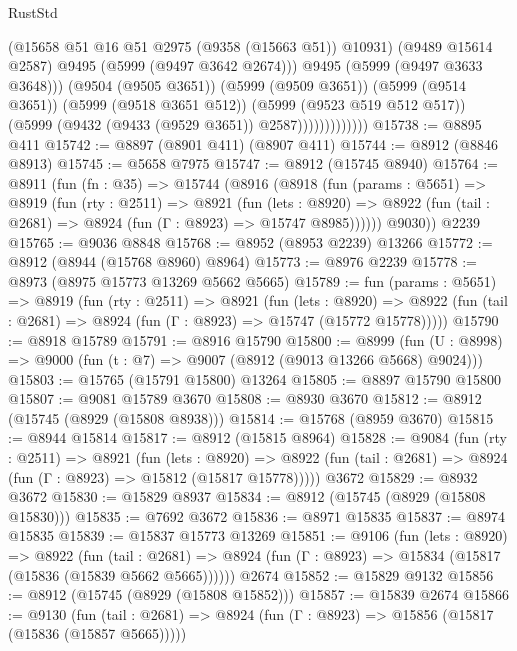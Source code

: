 \begin{lexlean}{RustStd}
\begin{coremodule}
                              (@15658 @51 @16 @51 @2975 (@9358 (@15663 @51)) @10931)
                              (@9489 @15614 @2587)
                              @9495
                              (@5999 (@9497 @3642 @2674)))
                            @9495
                            (@5999 (@9497 @3633 @3648)))
                          (@9504 (@9505 @3651))
                          (@5999 (@9509 @3651))
                          (@5999 (@9514 @3651))
                          (@5999 (@9518 @3651 @512))
                          (@5999 (@9523 @519 @512 @517))
                          (@5999 (@9432 (@9433 (@9529 @3651)) @2587)))))))))))))
@15738 := @8895 @411
@15742 := @8897 (@8901 @411) (@8907 @411)
@15744 := @8912 (@8846 @8913)
@15745 := @5658 @7975
@15747 := @8912 (@15745 @8940)
@15764 := @8911
    (fun (fn : @35) =>
    @15744
      (@8916
        (@8918
          (fun (params : @5651) =>
          @8919
            (fun (rty : @2511) =>
            @8921
              (fun (lets : @8920) =>
              @8922 (fun (tail : @2681) => @8924 (fun (Γ : @8923) => @15747 @8985))))))
        @9030))
    @2239
@15765 := @9036 @8848
@15768 := @8952 (@8953 @2239) @13266
@15772 := @8912 (@8944 (@15768 @8960) @8964)
@15773 := @8976 @2239
@15778 := @8973 (@8975 @15773 @13269 @5662 @5665)
@15789 := fun (params : @5651) =>
  @8919
    (fun (rty : @2511) =>
    @8921
      (fun (lets : @8920) =>
      @8922 (fun (tail : @2681) => @8924 (fun (Γ : @8923) => @15747 (@15772 @15778)))))
@15790 := @8918 @15789
@15791 := @8916 @15790
@15800 := @8999
    (fun (U : @8998) => @9000 (fun (t : @7) => @9007 (@8912 (@9013 @13266 @5668) @9024)))
@15803 := @15765 (@15791 @15800) @13264
@15805 := @8897 @15790 @15800
@15807 := @9081 @15789 @3670
@15808 := @8930 @3670
@15812 := @8912 (@15745 (@8929 (@15808 @8938)))
@15814 := @15768 (@8959 @3670)
@15815 := @8944 @15814
@15817 := @8912 (@15815 @8964)
@15828 := @9084
    (fun (rty : @2511) =>
    @8921
      (fun (lets : @8920) =>
      @8922 (fun (tail : @2681) => @8924 (fun (Γ : @8923) => @15812 (@15817 @15778)))))
    @3672
@15829 := @8932 @3672
@15830 := @15829 @8937
@15834 := @8912 (@15745 (@8929 (@15808 @15830)))
@15835 := @7692 @3672
@15836 := @8971 @15835
@15837 := @8974 @15835
@15839 := @15837 @15773 @13269
@15851 := @9106
    (fun (lets : @8920) =>
    @8922
      (fun (tail : @2681) =>
      @8924 (fun (Γ : @8923) => @15834 (@15817 (@15836 (@15839 @5662 @5665))))))
    @2674
@15852 := @15829 @9132
@15856 := @8912 (@15745 (@8929 (@15808 @15852)))
@15857 := @15839 @2674
@15866 := @9130
    (fun (tail : @2681) => @8924 (fun (Γ : @8923) => @15856 (@15817 (@15836 (@15857 @5665)))))

\end{coremodule}
\end{lexlean}
